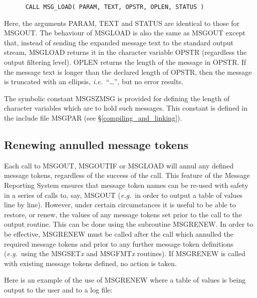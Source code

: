 \documentclass[twoside,11pt]{article}
\newcommand{\htmlref}[2]{#1}
\newcommand{\latex}[1]{#1}
\newcommand{\xlabel}[1]{}
\renewcommand{\_}{\texttt{\symbol{95}}}
\begin{document}
\begin {small}
\begin{verbatim}
      CALL MSG_LOAD( PARAM, TEXT, OPSTR, OPLEN, STATUS )
\end{verbatim}
\end {small}

Here, the arguments PARAM, TEXT and STATUS are identical to those for MSG\_OUT.
The behaviour of MSG\_LOAD is also the same as MSG\_OUT except that, instead of
sending the expanded message text to the standard output stream, MSG\_LOAD
returns it in the character variable OPSTR (regardless the output filtering
level).
OPLEN returns the length of the message in OPSTR.
If the message text is longer than the declared length of OPSTR, then the
message is truncated with an ellipsis, \textit{i.e.}\ ``\ldots'', but no error 
results.

The symbolic constant MSG\_\_SZMSG is provided for defining the length of 
character variables which are to hold such messages.
This constant is defined in the include file 
\htmlref
{MSG\_PAR}{compiling_and_linking}\latex{ (see \S\ref{compiling_and_linking})}.


\subsection{\xlabel{renewing_annulled_message_tokens}Renewing annulled message tokens}

Each call to MSG\_OUT, MSG\_OUTIF or MSG\_LOAD will annul any defined message 
tokens, regardless of the success of the call.
This feature of the Message Reporting System ensures that message token names
can be re-used with safety in a series of calls to, say, MSG\_OUT (\textit{e.g.}\ 
in order to output a table of values line by line).
However, under certain circumstances it is useful to be able to restore, or 
renew, the values of any message tokens set prior to the call to the output
routine. This can be done using the subroutine MSG\_RENEW.
In order to be effective, MSG\_RENEW must be called after the call
which annulled the required message tokens and prior to any further message
token  definitions (\textit{e.g.}\ using the MSG\_SET\textit{x} and MSG\_FMT\textit{x} 
routines). 
If MSG\_RENEW is called with existing message tokens defined, no action is
taken.

Here is an example of the use of MSG\_RENEW where a table of values is being
output to the user and to a log file:
\end{document}
